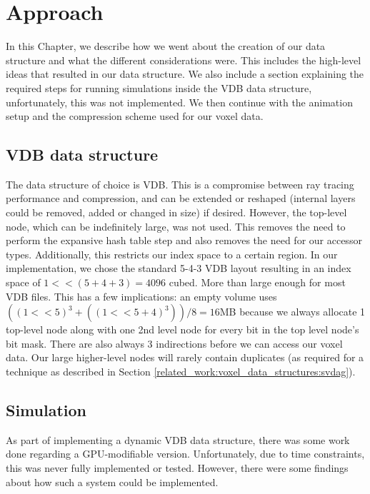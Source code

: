 \section{Approach} \label{approach}
In this Chapter, we describe how we went about the creation of our data structure and what the different considerations were. This includes the high-level ideas that resulted in our data structure. We also include a section explaining the required steps for running simulations inside the VDB data structure, unfortunately, this was not implemented. We then continue with the animation setup and the compression scheme used for our voxel data.




\subsection{VDB data structure} \label{approach:vdb_data_structure}
The data structure of choice is VDB. This is a compromise between ray tracing performance and compression, and can be extended or reshaped (internal layers could be removed, added or changed in size) if desired. However, the top-level node, which can be indefinitely large, was not used. This removes the need to perform the expansive hash table step and also removes the need for our accessor types. Additionally, this restricts our index space to a certain region. In our implementation, we chose the standard 5-4-3 VDB layout resulting in an index space of $1 << (5+4+3) = 4096$ cubed. More than large enough for most VDB files. This has a few implications: an empty volume uses $((1<<5)^3+((1<<5+4)^3)) / 8 = 16$MB because we always allocate 1 top-level node along with one 2nd level node for every bit in the top level node's bit mask. There are also always 3 indirections before we can access our voxel data. Our large higher-level nodes will rarely contain duplicates (as required for a technique as described in Section \ref{related_work:voxel_data_structures:svdag}).

\subsection{Simulation} \label{approach:simulation}
As part of implementing a dynamic VDB data structure, there was some work done regarding a GPU-modifiable version. Unfortunately, due to time constraints, this was never fully implemented or tested. However, there were some findings about how such a system could be implemented.

